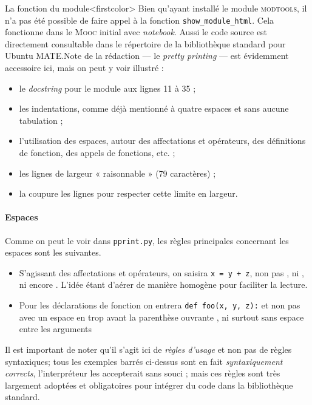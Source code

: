 La fonction du module\caution[t]<firstcolor>{%
Bien qu'ayant installé le module \textsc{modtools}, il n'a pas été possible de faire appel à la fonction \texttt{show\_module\_html}. Cela fonctionne dans le \textsc{Mooc} initial avec \textit{notebook}. Aussi le code source est directement consultable dans le répertoire de la bibliothèque standard  pour Ubuntu MATE.}{Note de la rédaction}
 --- le \textit{pretty printing} --- est évidemment accessoire ici, mais on peut y voir illustré :
\begin{itemize}
\item le \textit{docstring} pour le module aux lignes 11 à 35 ;
\item les indentations, comme déjà mentionné à quatre espaces et sans aucune tabulation ;
\item l'utilisation des espaces, autour des affectations et opérateurs, des définitions de fonction, des appels de fonctions, etc. ;
\item les lignes de largeur « raisonnable » (79 caractères) ;
\item la coupure les lignes pour respecter cette limite en largeur.
\end{itemize}

\paragraph*{Espaces}
Comme on peut le voir dans \texttt{pprint.py}, les règles principales concernant les espaces sont les suivantes.
\begin{itemize}\jazzitem
\item S'agissant des affectations et opérateurs, on saisira \texttt{x = y + z}, non pas , ni , ni encore . L'idée étant d'aérer de manière homogène pour faciliter la lecture.
\item  Pour les déclarations de fonction on entrera \texttt{def foo(x, y, z):} et non pas avec un espace en trop avant la parenthèse ouvrante , ni surtout sans espace entre les arguments 
\end{itemize}

Il est important de noter qu'il s'agit ici de \emph{règles d'usage} et non pas de règles syntaxiques; tous les exemples barrés ci-dessus sont en fait \emph{syntaxiquement corrects}, l'interpréteur les accepterait sans souci ; mais ces règles sont très largement adoptées et obligatoires pour intégrer du code dans la bibliothèque standard.


